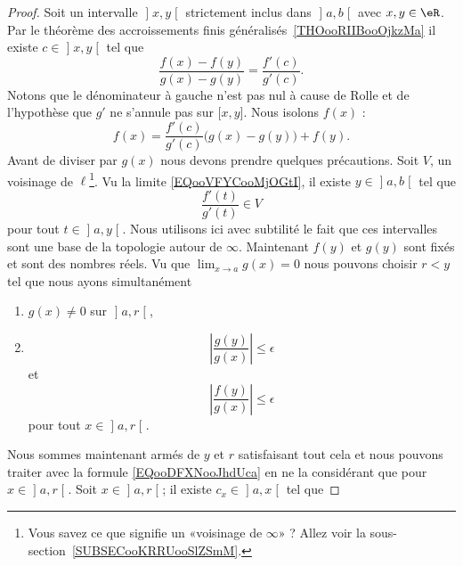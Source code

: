 \begin{proof}
Soit un intervalle \( \mathopen] x , y \mathclose[\) strictement inclus dans \( \mathopen] a , b \mathclose[\) avec \( x,y\in\eR\). Par le théorème des accroissements finis généralisés~\ref{THOooRIIBooOjkzMa} il existe \( c\in \mathopen] x , y \mathclose[\) tel que
    \begin{equation}
        \frac{ f(x)-f(y) }{ g(x)-g(y) }=\frac{ f'(c) }{ g'(c) }.
    \end{equation}
    Notons que le dénominateur à gauche n'est pas nul à cause de Rolle et de l'hypothèse que \( g'\) ne s'annule pas sur \( \mathopen[ x , y \mathclose]\). Nous isolons \( f(x)\) :
    \begin{equation}        \label{EQooDFXNooJhdUca}
        f(x)=\frac{ f'(c) }{ g'(c) }\Big( g(x)-g(y) \Big)+f(y).
    \end{equation}
Avant de diviser par \( g(x)\) nous devons prendre quelques précautions. Soit \( V\), un voisinage de \( \ell\)\footnote{Vous savez ce que signifie un «voisinage de \( \infty\)» ? Allez voir la sous-section~\ref{SUBSECooKRRUooSlZSmM}.}. Vu la limite \eqref{EQooVFYCooMjOGtI}, il existe \( y\in \mathopen] a , b \mathclose[\) tel que
    \begin{equation}
        \frac{ f'(t) }{ g'(t) }\in V
    \end{equation}
pour tout \( t\in \mathopen] a , y \mathclose[\). Nous utilisons ici avec subtilité le fait que ces intervalles sont une base de la topologie autour de \( \infty\). Maintenant \( f(y)\) et \( g(y)\) sont fixés et sont des nombres réels. Vu que \( \lim_{x\to a} g(x)=0\) nous pouvons choisir \( r<y\) tel que nous ayons simultanément
    \begin{enumerate}
        \item
        \( g(x)\neq 0\) sur \( \mathopen] a , r \mathclose[\),
        \item
            \begin{equation}
                | \frac{ g(y) }{ g(x) } |\leq \epsilon
            \end{equation}
            et
            \begin{equation}
                | \frac{ f(y) }{ g(x) } |\leq \epsilon
            \end{equation}
        pour tout \( x\in \mathopen] a , r \mathclose[\).
    \end{enumerate}
Nous sommes maintenant armés de \( y\) et \( r\) satisfaisant tout cela et nous pouvons traiter avec la formule \eqref{EQooDFXNooJhdUca} en ne la considérant que pour \( x\in \mathopen] a , r \mathclose[\). Soit \( x\in \mathopen] a , r \mathclose[\); il existe \( c_x\in \mathopen] a , x \mathclose[\) tel que

\end{proof}
